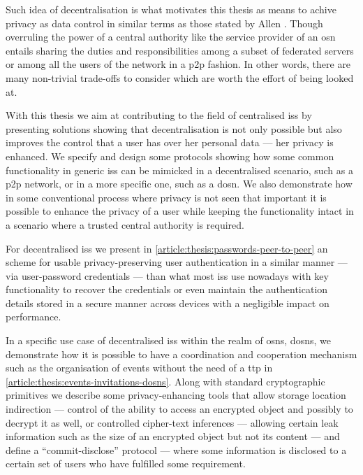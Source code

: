 Such idea of decentralisation is what motivates this thesis as means to achive 
privacy as data control in similar terms as those stated by Allen \cite{Allen99}. 
Though overruling the power of a central authority like the service provider of 
an \ac{osn} entails sharing the duties and responsibilities among a subset of federated 
servers or among all the users of the network in a \ac{p2p} fashion. In other words, 
there are many non-trivial trade-offs to consider which are worth the effort of 
being looked at.

With this thesis we aim at contributing to the field of centralised \acp{is} by 
presenting solutions showing that decentralisation is not only possible but also 
improves the control that a user has over her personal data --- her privacy is enhanced. 
We specify and design some protocols showing how some common functionality in 
generic \acp{is} can be mimicked in a decentralised scenario, such as a \ac{p2p} 
network, or in a more specific one, such as a \ac{dosn}. We also demonstrate how 
in some conventional process where privacy is not seen that important it is possible 
to enhance the privacy of a user while keeping the functionality intact in a scenario 
where a trusted central authority is required.

For decentralised \acp{is} we present in \cref{article:thesis:passwords-peer-to-peer} an 
scheme for usable privacy-preserving user authentication in a similar manner --- 
via user-password credentials --- than what most \acp{is} use nowadays with key 
functionality to recover the credentials or even maintain the authentication details 
stored in a secure manner across devices with a negligible impact on performance.

In a specific use case of decentralised \acp{is} within the realm of \acp{osn}, 
\acp{dosn}, we demonstrate how it is possible to have a coordination and cooperation 
mechanism such as the organisation of events without the need of a \ac{ttp} in \cref{article:thesis:events-invitations-dosns}. 
Along with standard cryptographic primitives we describe some privacy-enhancing 
tools that allow storage location indirection --- control of the ability to access 
an encrypted object and possibly to decrypt it as well, or controlled cipher-text 
inferences --- allowing certain leak information such as the size of an encrypted 
object but not its content --- and define a ``commit-disclose'' protocol --- where 
some information is disclosed to a certain set of users who have fulfilled some 
requirement.

